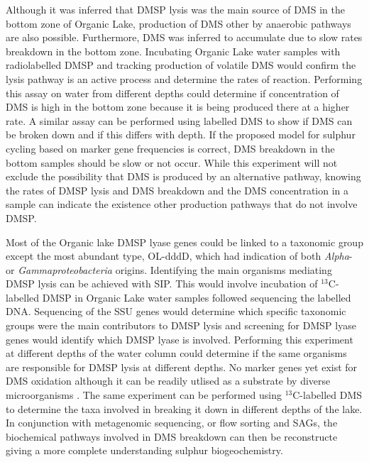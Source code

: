 Although it was inferred that \ac{DMSP} lysis was the main source of \ac{DMS} in the bottom zone of Organic Lake, production of \ac{DMS} other by anaerobic pathways are also possible.
Furthermore, \ac{DMS} was inferred to accumulate due to slow rates breakdown in the bottom zone.
Incubating Organic Lake water samples with radiolabelled \ac{DMSP} and tracking production of volatile \ac{DMS} would confirm the lysis pathway is an active process and determine the rates of reaction.
Performing this assay on water from different depths could determine if concentration of \ac{DMS} is high in the bottom zone because it is being produced there at a higher rate.
A similar assay can be performed using labelled \ac{DMS} to show if \ac{DMS} can be broken down and if this differs with depth.
If the proposed model for sulphur cycling based on marker gene frequencies is correct, \ac{DMS} breakdown in the bottom samples should be slow or not occur.
While this experiment will not exclude the possibility that \ac{DMS} is produced by an alternative pathway, knowing the rates of \ac{DMSP} lysis and \ac{DMS} breakdown and the \ac{DMS} concentration in a sample can indicate the existence other production pathways that do not involve \ac{DMSP}.

Most of the Organic lake \ac{DMSP} lyase genes could be linked to a taxonomic group except the most abundant type, OL-dddD, which had indication of both \emph{Alpha}- or \emph{Gammaproteobacteria} origins.
Identifying the main organisms mediating \ac{DMSP} lysis can be achieved with \ac{SIP}.
This would involve incubation of $^{13}$C-labelled \ac{DMSP} in Organic Lake water samples followed sequencing the labelled DNA.
Sequencing of the \ac{SSU} genes would determine which specific taxonomic groups were the main contributors to \ac{DMSP} lysis and screening for \ac{DMSP} lyase genes would identify which \ac{DMSP} lyase is involved.
Performing this experiment at different depths of the water column could determine if the same organisms are responsible for \ac{DMSP} lysis at different depths.
No marker genes yet exist for \ac{DMS} oxidation although it can be readily utlised as a substrate by diverse microorganisms \cite{Johnston2008}.
The same experiment can be performed using $^{13}$C-labelled \ac{DMS} to determine the taxa involved in breaking it down in different depths of the lake.
In conjunction with metagenomic sequencing, or flow sorting and \acp{SAG}, the biochemical pathways involved in \ac{DMS} breakdown can then be reconstructe giving a more complete understanding sulphur biogeochemistry.

